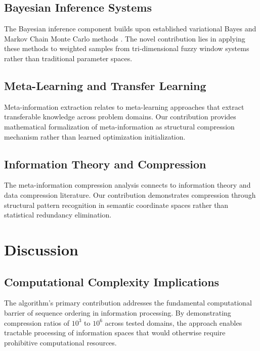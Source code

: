 \documentclass[12pt,a4paper]{article}
\begin{document}
\begin{table}[h]
\subsection{Bayesian Inference Systems}

The Bayesian inference component builds upon established variational Bayes \cite{jordan1999introduction} and Markov Chain Monte Carlo methods \cite{gilks1995markov}. The novel contribution lies in applying these methods to weighted samples from tri-dimensional fuzzy window systems rather than traditional parameter spaces.

\subsection{Meta-Learning and Transfer Learning}

Meta-information extraction relates to meta-learning approaches \cite{hospedales2021meta} that extract transferable knowledge across problem domains. Our contribution provides mathematical formalization of meta-information as structural compression mechanism rather than learned optimization initialization.

\subsection{Information Theory and Compression}

The meta-information compression analysis connects to information theory \cite{cover2006elements} and data compression literature. Our contribution demonstrates compression through structural pattern recognition in semantic coordinate spaces rather than statistical redundancy elimination.

\section{Discussion}

\subsection{Computational Complexity Implications}

The algorithm's primary contribution addresses the fundamental computational barrier of sequence ordering in information processing. By demonstrating compression ratios of $10^3$ to $10^6$ across tested domains, the approach enables tractable processing of information spaces that would otherwise require prohibitive computational resources.


\end{table}
\end{document}
